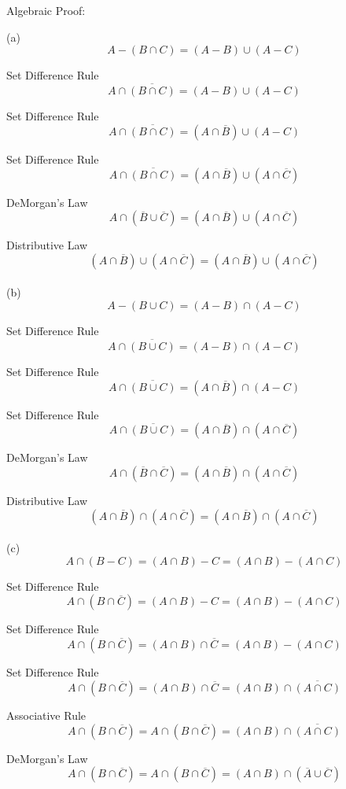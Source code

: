 \documentclass[10pt]{article}
\begin{document}
Algebraic Proof:

(a)
$$A - (B \cap C) = (A - B) \cup (A - C)$$

Set Difference Rule
$$A \cap \overline{(B \cap C)} = (A - B) \cup (A - C)$$

Set Difference Rule
$$A \cap \overline{(B \cap C)} = (A \cap \overline{B}) \cup (A - C)$$

Set Difference Rule
$$A \cap \overline{(B \cap C)} = (A \cap \overline{B}) \cup (A \cap \overline{C})$$

DeMorgan's Law
$$A \cap (\overline{B} \cup \overline{C}) = (A \cap \overline{B}) \cup (A \cap \overline{C})$$

Distributive Law
$$(A \cap \overline{B}) \cup (A \cap \overline{C}) = (A \cap \overline{B}) \cup (A \cap \overline{C})$$\\

(b)
$$A - (B \cup C) = (A - B) \cap (A - C)$$

Set Difference Rule
$$A \cap \overline{(B \cup C)} = (A - B) \cap (A - C)$$

Set Difference Rule
$$A \cap \overline{(B \cup C)} = (A \cap \overline{B}) \cap (A - C)$$

Set Difference Rule
$$A \cap \overline{(B \cup C)} = (A \cap \overline{B}) \cap (A \cap \overline{C})$$

DeMorgan's Law
$$A \cap (\overline{B} \cap \overline{C}) = (A \cap \overline{B}) \cap (A \cap \overline{C})$$

Distributive Law
$$(A \cap \overline{B}) \cap (A \cap \overline{C}) = (A \cap \overline{B}) \cap (A \cap \overline{C})$$\\

(c)
$$A \cap (B - C) = (A \cap B) -  C = (A \cap B) - (A \cap C)$$

Set Difference Rule
$$A \cap (B \cap \overline{C}) = (A \cap B) - C = (A \cap B) - (A \cap C)$$

Set Difference Rule
$$A \cap (B \cap \overline{C}) = (A \cap B) \cap \overline{C} = (A \cap B) - (A \cap C)$$

Set Difference Rule
$$A \cap (B \cap \overline{C}) = (A \cap B) \cap \overline{C} = (A \cap B) \cap \overline{(A \cap C)}$$

Associative Rule
$$A \cap (B \cap \overline{C}) = A \cap (B \cap \overline{C}) = (A \cap B) \cap \overline{(A \cap C)}$$

DeMorgan's Law
$$A \cap (B \cap \overline{C}) = A \cap (B \cap \overline{C}) = (A \cap B) \cap (\overline{A} \cup \overline{C})$$
\end{document}
